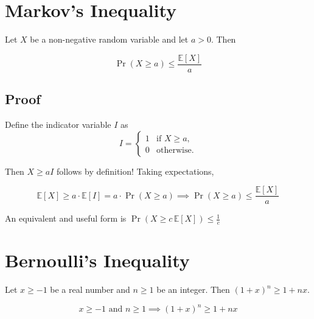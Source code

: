 \section{Markov's Inequality}
\label{markov_inequality}

\noindent Let \(X\) be a non-negative random variable and let \(a>0\). Then

\[
\Pr(X\ge a)
\le
\frac{\mathbb E[X]}{a}
\]
\subsection*{Proof}

\noindent Define the indicator variable $I$ as 
\[
I=
\begin{cases}
1 & \text{if } X\ge a,\\
0 & \text{otherwise}.
\end{cases}
\]

\noindent Then \(X\ge aI\) follows by definition! Taking expectations,

\[
\mathbb E[X]
\ge
a\cdot\mathbb E[I]
=
a\cdot\Pr(X\ge a)
\implies
\Pr(X\ge a)
\le
\frac{\mathbb E[X]}{a}
\]

\vspace{0.5em}
\noindent An equivalent and useful form is \(\Pr(X\ge c\,\mathbb E[X])\le \frac{1}{c}\)

\section{Bernoulli's Inequality}
\label{bernoulli}
Let \(x\ge -1\) be a real number and \(n\ge 1\) be an integer. Then $(1+x)^n \ge 1+nx$.

\[
x \ge -1 \text{ and } n\ge 1 \implies (1+x)^n\ge 1+nx
\]

\begin{center}
\end{center}

